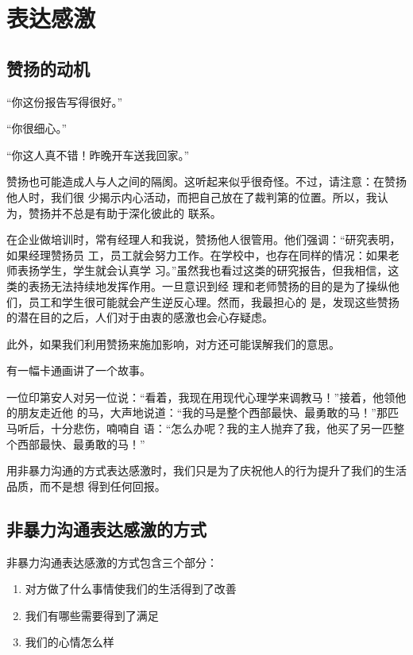 \documentclass{ctexart}
\renewenvironment{quotation}{\setlength{\parskip}{0.5em}\setstretch{1.5}\kaishu\zihao{-5}\setlength{\parindent}{1em}}{\vspace{1em}}
\begin{document}
\section{表达感激}\label{sec:表达感激}


\subsection{赞扬的动机}

\begin{quotation}
	``你这份报告写得很好。''

	``你很细心。''

	``你这人真不错！昨晚开车送我回家。''
\end{quotation}

赞扬也可能造成人与人之间的隔阂。这听起来似乎很奇怪。不过，请注意：在赞扬他人时，我们很
少揭示内心活动，而把自己放在了裁判第的位置。所以，我认为，赞扬并不总是有助于深化彼此的
联系。

在企业做培训时，常有经理人和我说，赞扬他人很管用。他们强调：``研究表明，如果经理赞扬员
工，员工就会努力工作。在学校中，也存在同样的情况：如果老师表扬学生，学生就会认真学
习。''虽然我也看过这类的研究报告，但我相信，这类的表扬无法持续地发挥作用。一旦意识到经
理和老师赞扬的目的是为了操纵他们，员工和学生很可能就会产生逆反心理。然而，我最担心的
是，发现这些赞扬的潜在目的之后，人们对于由衷的感激也会心存疑虑。

此外，如果我们利用赞扬来施加影响，对方还可能误解我们的意思。

有一幅卡通画讲了一个故事。

一位印第安人对另一位说：``看着，我现在用现代心理学来调教马！''接着，他领他的朋友走近他
的马，大声地说道：``我的马是整个西部最快、最勇敢的马！''那匹马听后，十分悲伤，喃喃自
语：``怎么办呢？我的主人抛弃了我，他买了另一匹整个西部最快、最勇敢的马！''

用非暴力沟通的方式表达感激时，我们只是为了庆祝他人的行为提升了我们的生活品质，而不是想
得到任何回报。


\subsection{非暴力沟通表达感激的方式}

非暴力沟通表达感激的方式包含三个部分：

\begin{enumerate}
	\item 对方做了什么事情使我们的生活得到了改善
	\item 我们有哪些需要得到了满足
	\item 我们的心情怎么样
\end{enumerate}
\end{document}
